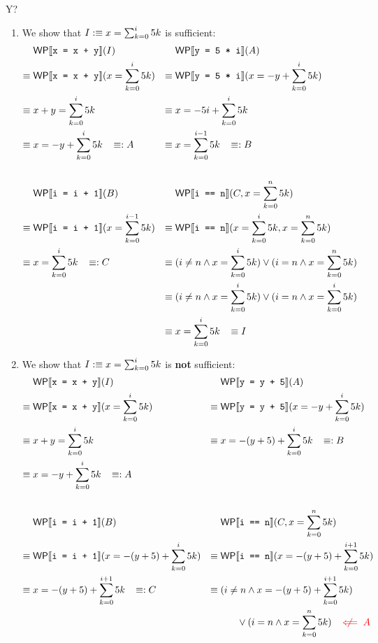 \documentclass[
  english
]{tumteaching}
\begin{document}
\begin{assignment}[L]{Y?}
\begin{solution}
	\begin{enumerate}
	\item
		We show that $I :\equiv x = \sum_{k=0}^{i} 5k$ is sufficient:
		\begin{align*}
			&\;\textsf{WP}\llbracket{}\texttt{x = x + y}\rrbracket{}(I) &&\;\textsf{WP}\llbracket{}\texttt{y = 5 * i}\rrbracket{}(A)\\
			\equiv&\;\textsf{WP}\llbracket{}\texttt{x = x + y}\rrbracket{}(x = \sum_{k=0}^{i} 5k) &\equiv&\;\textsf{WP}\llbracket{}\texttt{y = 5 * i}\rrbracket{}(x = -y + \sum_{k=0}^{i} 5k)\\
			\equiv&\;x + y = \sum_{k=0}^{i} 5k &\equiv&\;x = -5i + \sum_{k=0}^{i} 5k\\
			\equiv&\; x = -y + \sum_{k=0}^{i} 5k \;\;\; \equiv: A &\equiv&\;x = \sum_{k=0}^{i-1} 5k \;\;\; \equiv: B\\
			&&&\\
			&\;\textsf{WP}\llbracket{}\texttt{i = i + 1}\rrbracket{}(B) &	&\;\textsf{WP}\llbracket{}\texttt{i == n}\rrbracket{}(C, x = \sum_{k=0}^{n} 5k)\\
			\equiv&\;\textsf{WP}\llbracket{}\texttt{i = i + 1}\rrbracket{}(x = \sum_{k=0}^{i-1} 5k) &	\equiv&\;\textsf{WP}\llbracket{}\texttt{i == n}\rrbracket{}(x = \sum_{k=0}^{i} 5k, x = \sum_{k=0}^{n} 5k)\\
			\equiv&\;x = \sum_{k=0}^{i} 5k \;\;\; \equiv: C&	\equiv&\;(i \neq n  \land x = \sum_{k=0}^{i} 5k) \lor (i = n \land x = \sum_{k=0}^{n} 5k)\\
			&&\equiv&\;(i \neq n  \land x = \sum_{k=0}^{i} 5k) \lor (i = n \land x = \sum_{k=0}^{i} 5k)\\
			&&\equiv&\;x = \sum_{k=0}^{i} 5k \;\;\; \equiv I\\
		\end{align*}

	\item We show that $I :\equiv x = \sum_{k=0}^{i} 5k$ is \textbf{not} sufficient:
		\begin{align*}
			&\;\WP{x = x + y}(I) &&\;\WP{y = y + 5}(A)\\
			\equiv&\;\WP{x = x + y}(x = \sum_{k=0}^{i} 5k) &\equiv&\;\WP{y = y + 5}(x = -y + \sum_{k=0}^{i} 5k)\\
			\equiv&\;x + y = \sum_{k=0}^{i} 5k &\equiv&\;x = -(y + 5) + \sum_{k=0}^{i} 5k  \;\;\; \equivdef B\\
			\equiv&\; x = -y + \sum_{k=0}^{i} 5k \;\;\; \equivdef A &&\\
			&&&\\
			&\;\WP{i = i + 1}(B) &&\;\WP{i == n}(C, x = \sum_{k=0}^{n} 5k)\\
			\equiv&\;\WP{i = i + 1}(x = -(y + 5) + \sum_{k=0}^{i} 5k) &\equiv&\;\WP{i == n}(x = -(y + 5) + \sum_{k=0}^{i+1} 5k)\\
			\equiv&\;x = -(y + 5) + \sum_{k=0}^{i+1} 5k \;\;\; \equivdef C &\equiv&\;(i \neq n \land x = -(y + 5) + \sum_{k = 0}^{i+1} 5k)\\
			&&&\qquad \lor (i = n \land x = \sum_{k=0}^{n} 5k) \;\;\; \textcolor{red}{\centernot \impliedby A}\\
		\end{align*}


\end{enumerate}
\end{solution}
\end{assignment}
\end{document}
